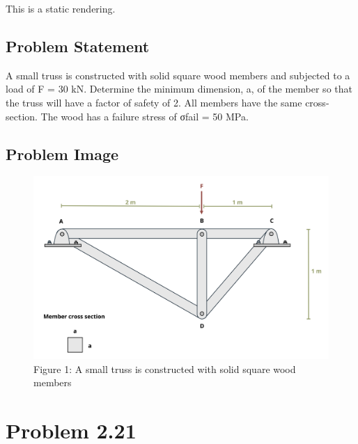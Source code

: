 \documentclass[
  letterpaper,
  DIV=11,
  numbers=noendperiod]{scrreprt}
\begin{document}
This is a static rendering.

\section*{Problem Statement}\label{problem-statement-6}


A small truss is constructed with solid square wood members and
subjected to a load of F = 30 kN. Determine the minimum dimension, a, of
the member so that the truss will have a factor of safety of 2. All
members have the same cross-section. The wood has a failure stress of
σfail = 50 MPa.

\section*{Problem Image}\label{problem-image-16}


\begin{figure}[H]

{\centering \includegraphics{images/157.png}

}

\caption{Figure 1: A small truss is constructed with solid square wood
members}

\end{figure}%

\chapter*{Problem 2.21}\label{problem-2.21-1}
\end{document}
